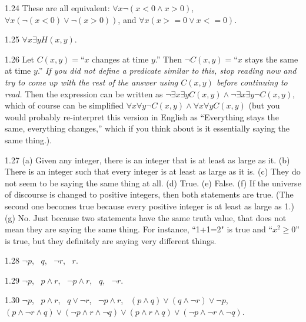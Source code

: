 \begin{RequAnswer}{1.24}
These are all equivalent: $ \forall x  \neg(x<0 \wedge x>0)$,
$ \forall x  (\neg(x<0) \vee  \neg(x>0))$, and
$ \forall x  (x>=0 \vee  x<=0)$.
\end{RequAnswer}
\begin{RequAnswer}{1.25}
$\forall x\exists y H(x,y)$.
\end{RequAnswer}
\begin{RequAnswer}{1.26}
Let $C(x,y)=$``$x$ changes at time $y$.''
Then $\neg C(x,y)=$``$x$ stays the same at time $y$.''
{\em If you did not define a predicate similar to this, stop reading now
and try to come up with the rest of the answer using $C(x,y)$ before continuing to read.}
Then the expression can be written as $\neg\exists x\exists y  C(x,y)\wedge \neg\exists x\exists y \neg C(x,y)$,
which of course can be simplified $\forall x\forall y \neg C(x,y) \wedge \forall x \forall y C(x,y)$
(but you would probably re-interpret this version in English as ``Everything stays the same, everything changes,''
which if you think about is it essentially saying the same thing.).
\end{RequAnswer}
\begin{RequAnswer}{1.27}
(a) Given any integer, there is an integer that is at least as large as it.
(b) There is an integer such that every integer is at least as large as it is.
(c) They do not seem to be saying the same thing at all.
(d) True.
(e) False.
(f) If the universe of discourse is changed to positive integers, then both statements are true.
(The second one becomes true because every positive integer is at least as large as 1.)
(g) No. Just because two statements have the same truth value, that does not mean they are saying the same thing.
For instance, ``1+1=2" is true and ``$x^2\geq 0$'' is true, but they definitely are saying very different things.
\end{RequAnswer}
\begin{RequAnswer}{1.28}
$\neg p$, \, $q$, \, $\neg r$, \, $r$.
\end{RequAnswer}
\begin{RequAnswer}{1.29}
$\neg p$, \, $p\wedge r$, \, $\neg p \wedge r$, \, $q$,  \, $\neg r$.
\end{RequAnswer}
\begin{RequAnswer}{1.30}
$\neg p$, \,
$p\wedge r$, \,
$q\vee \neg r$, \,
$\neg p \wedge r$, \,
$(p\wedge q)\vee (q\wedge \neg r)\vee \neg p$, \,
$(p\wedge \neg r\wedge q)\vee (\neg p\wedge r \wedge \neg q)\vee(p\wedge r \wedge q)\vee(\neg p\wedge \neg r \wedge \neg q)$.
\end{RequAnswer}
